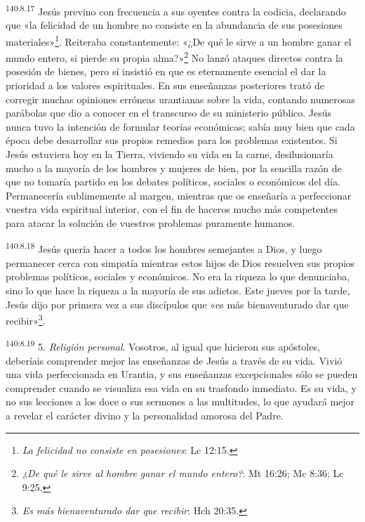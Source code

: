 \par 
\textsuperscript{140:8.17} Jesús previno con frecuencia a sus oyentes contra la codicia, declarando que «la felicidad de un hombre no consiste en la abundancia de sus posesiones materiales»\footnote{\textit{La felicidad no consiste en posesiones}: Lc 12:15.}. Reiteraba constantemente: «¿De qué le sirve a un hombre ganar el mundo entero, si pierde su propia alma?»\footnote{\textit{¿De qué le sirve al hombre ganar el mundo entero?}: Mt 16:26; Mc 8:36; Lc 9:25.} No lanzó ataques directos contra la posesión de bienes, pero sí insistió en que es eternamente esencial el dar la prioridad a los valores espirituales. En sus enseñanzas posteriores trató de corregir muchas opiniones erróneas urantianas sobre la vida, contando numerosas parábolas que dio a conocer en el transcurso de su ministerio público. Jesús nunca tuvo la intención de formular teorías económicas; sabía muy bien que cada época debe desarrollar sus propios remedios para los problemas existentes. Si Jesús estuviera hoy en la Tierra, viviendo su vida en la carne, desilusionaría mucho a la mayoría de los hombres y mujeres de bien, por la sencilla razón de que no tomaría partido en los debates políticos, sociales o económicos del día. Permanecería sublimemente al margen, mientras que os enseñaría a perfeccionar vuestra vida espiritual interior, con el fin de haceros mucho más competentes para atacar la solución de vuestros problemas puramente humanos.

\par 
\textsuperscript{140:8.18} Jesús quería hacer a todos los hombres semejantes a Dios, y luego permanecer cerca con simpatía mientras estos hijos de Dios resuelven sus propios problemas políticos, sociales y económicos. No era la riqueza lo que denunciaba, sino lo que hace la riqueza a la mayoría de sus adictos. Este jueves por la tarde, Jesús dijo por primera vez a sus discípulos que «es más bienaventurado dar que recibir»\footnote{\textit{Es más bienaventurado dar que recibir}: Hch 20:35.}.

\par 
\textsuperscript{140:8.19} 5. \textit{Religión personal}. Vosotros, al igual que hicieron sus apóstoles, deberíais comprender mejor las enseñanzas de Jesús a través de su vida. Vivió una vida perfeccionada en Urantia, y sus enseñanzas excepcionales sólo se pueden comprender cuando se visualiza esa vida en su trasfondo inmediato. Es su vida, y no sus lecciones a los doce o sus sermones a las multitudes, lo que ayudará mejor a revelar el carácter divino y la personalidad amorosa del Padre.

